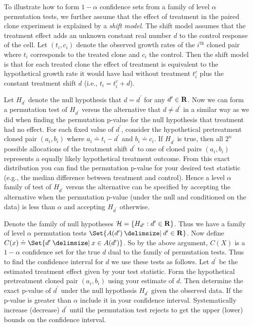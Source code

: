 \begin{example}[continues=exa:cont] To illustrate how to form $1-\alpha$
confidence sets from a family of level $\alpha$ permutation tests, we further
assume that the effect of treatment in the paired clone experiment is explained
by a \emph{shift model}.  The shift model assumes that the treatment effect
adds an unknown constant real number $d$ to the control response of the cell.
Let $(t_i, c_i)$ denote the observed growth rates of the $i^\text{th}$ cloned
pair where $t_i$ corresponds to the treated clone and $c_i$ the control.  Then
the shift model is that for each treated clone the effect of treatment is
equivalent to the hypothetical growth rate it would have had without treatment
$t_i^c$ plus the constant treatment shift $d$ (i.e., $t_i = t_i^c + d$).

Let $H_{d^\prime}$ denote the null hypothesis that $d=d^\prime$ for any
$d^\prime \in \mathbf{R}$.  Now we can form a permutation test of $H_{d^\prime}$
versus the alternative that $d \neq d^\prime$ in a similar way as we did when
finding the permutation p-value for the null hypothesis that treatment had no
effect. For each fixed value of $d^\prime$, consider the hypothetical
pretreatment cloned pair $(a_i, b_i)$ where $a_i\doteq t_i-d^\prime$ and $b_i
\doteq c_i$. If $H_{d^\prime}$ is true, then all $2^n$ possible allocations of
the treatment shift $d^\prime$ to one of cloned pairs $(a_i, b_i)$ represents a
equally likely hypothetical treatment outcome. From this exact distribution you
can find the permutation p-value for your desired test statistic (e.g., the
median difference between treatment and control). Hence a level $\alpha$ family
of test of $H_{d^\prime}$ versus the alternative can be specified by accepting
the alternative when the permutation p-value (under the null and conditioned on
the data) is less than $\alpha$ and accepting $H_{d^\prime}$ otherwise. 

Denote the family of null hypotheses $\mathcal{H} = \{H_{d^\prime} : d^\prime
\in \mathbf{R}\}$.  Thus we have a family of level $\alpha$ permutation tests
$\Set{A(d^\prime) \given d^\prime \in \reals}$. Now define $C(x) \doteq \Set{d' \given x \in
A(d')}$.  So by the above argument, $C(X)$ is a $1-\alpha$ confidence set
for the true $d$ dual to the family of permutation tests.
Thus to find the confidence interval for $d$ we use these tests as follows.
Let $d^\prime$ be the estimated treatment effect given by your test statistic.
Form the hypothetical pretreatment cloned pair $(a_i, b_i)$ using your estimate
of $d$.  Then determine the exact p-value of $d^\prime$ under the null
hypothesis $H_{d^\prime}$ given the observed data. If the p-value is greater
than $\alpha$ include it in your confidence interval.  Systematically increase
(decrease) $d^\prime$ until the permutation test rejects to get the upper (lower)
bounds on the confidence interval.


\end{example}
